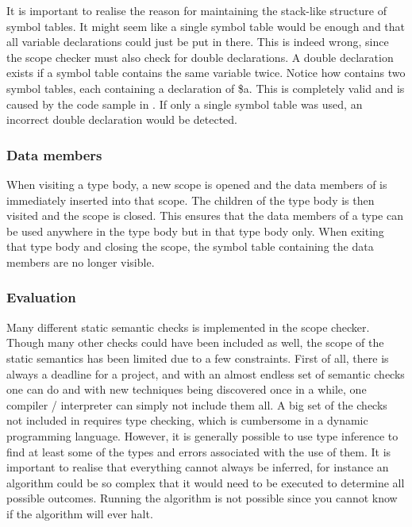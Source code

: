 

It is important to realise the reason for maintaining the stack-like structure of symbol tables. It might seem like a single symbol table would be enough and that all variable declarations could just be put in there. This is indeed wrong, since the scope checker must also check for double declarations. A double declaration exists if a symbol table contains the same variable twice. Notice how  contains two symbol tables, each containing a declaration of \$a. This is completely valid and is caused by the code sample in . If only a single symbol table was used, an incorrect double declaration would be detected.

\subsubsection{Data members}
When visiting a type body, a new scope is opened and the data members of   is immediately inserted into that scope. The children of the type body is then visited and the scope is closed. This ensures that the data members of a type can be used anywhere in the type body but in that type body only. When exiting that type body and closing the scope, the symbol table containing the data members are no longer visible.

\subsubsection{Evaluation}
Many different static semantic checks is implemented in the scope checker. Though many other checks could have been included as well, the scope of the static semantics has been limited due to a few constraints. First of all, there is always a deadline for a project, and with an almost endless set of semantic checks one can do and with new techniques being discovered once in a while, one compiler / interpreter can simply not include them all. A big set of the checks not included in \productname{} requires type checking, which is cumbersome in a dynamic programming language. However, it is generally possible to use type inference to find at least some of the types and errors associated with the use of them. It is important to realise that everything cannot always be inferred, for instance an algorithm could be so complex that it would need to be executed to determine all possible outcomes. Running the algorithm is not possible since you cannot know if the algorithm will ever halt\cite{haltingproblem}.